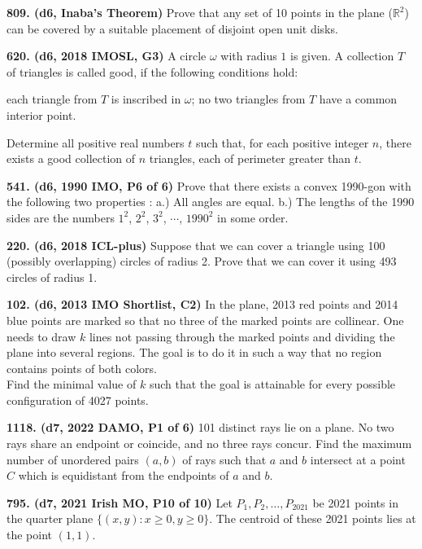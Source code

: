 \documentclass{article}
\begin{document}
\textbf{809. (\color{red}d6\color{black}, Inaba's Theorem)} Prove that any set of 10 points in the plane ($\mathbb{R}^2$) can be covered by a suitable placement of disjoint open unit disks.

\textbf{620. (\color{red}d6\color{black}, 2018 IMOSL, G3)} A circle $\omega$ with radius $1$ is given. A collection $T$ of triangles is called good, if the following conditions hold:

    each triangle from $T$ is inscribed in $\omega$;
    no two triangles from $T$ have a common interior point.

Determine all positive real numbers $t$ such that, for each positive integer $n$, there exists a good collection of $n$ triangles, each of perimeter greater than $t$.

\textbf{541. (\color{red}d6\color{black}, 1990 IMO, P6 of 6)} Prove that there exists a convex 1990-gon with the following two properties :
\smallbreak
a.) All angles are equal.
\smallbreak
b.) The lengths of the 1990 sides are the numbers $ 1^2$, $ 2^2$, $ 3^2$, $ \cdots$, $ 1990^2$ in some order.

\textbf{220. (\color{red}d6\color{black}, 2018 ICL-plus)} Suppose that we can cover a triangle using 100 (possibly overlapping) circles of radius 2. Prove that we can cover it using 493 circles of radius 1.

\textbf{102. (\color{red}d6\color{black}, 2013 IMO Shortlist, C2)} In the plane, 2013 red points and 2014 blue points are marked so that no three of the marked points are collinear. One needs to draw \(k\) lines not passing through the marked points and dividing the plane into several regions. The goal is to do it in such a way that no region contains points of both colors.\\

Find the minimal value of \(k\) such that the goal is attainable for every possible configuration of 4027 points.

\textbf{1118. (\color{red}d7\color{black}, 2022 DAMO, P1 of 6)} 101 distinct rays lie on a plane. No two rays share an endpoint or coincide, and no three rays concur. Find the maximum number of unordered pairs $(a, b) $ of rays such that $a$ and $b$ intersect at a point $C$ which is equidistant from the endpoints of $a$ and $b$. 

\textbf{795. (\color{red}d7\color{black}, 2021 Irish MO, P10 of 10)} Let $P_{1}, P_{2}, \ldots, P_{2021}$ be 2021 points in the quarter plane $\{(x, y): x \geq 0, y \geq 0\}$. The centroid of these 2021 points lies at the point $(1,1)$.
\end{document}
